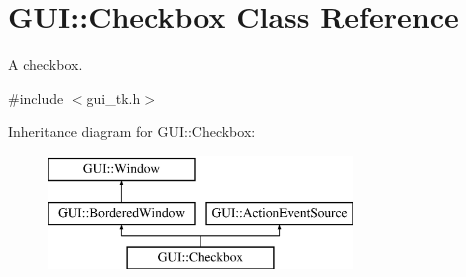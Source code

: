 \hypertarget{classGUI_1_1Checkbox}{\section{G\-U\-I\-:\-:Checkbox Class Reference}
\label{classGUI_1_1Checkbox}
}


A checkbox.  




{\ttfamily \#include $<$gui\-\_\-tk.\-h$>$}

Inheritance diagram for G\-U\-I\-:\-:Checkbox\-:\begin{figure}[H]
\begin{center}
\leavevmode
\includegraphics[height=3.000000cm]{classGUI_1_1Checkbox}
\end{center}
\end{figure}
